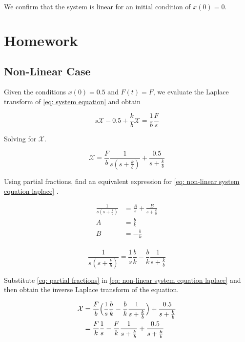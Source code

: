 We confirm that the system is linear for an initial 
condition of $x(0)=0$.

\section{Homework}

\subsection{Non-Linear Case}

Given the conditions $x(0) = 0.5$ and $F(t) = F$, we 
evaluate the Laplace transform of \ref{eq: system equation} 
and obtain

\begin{equation}
  s \mathcal{X} - 0.5 + \frac{k}{b} \mathcal{X} = 
\frac{1}{b} \frac{F}{s}
\end{equation}

Solving for $\mathcal{X}$.

\begin{equation}
 \mathcal{X} = \frac{F}{b}
\frac{1}{s(s+\frac{k}{b})} + \frac{0.5}{s+\frac{k}{b}} 
\label{eq: non-linear system equation laplace}
\end{equation}

Using partial fractions, find an equivalent expression for 
\ref{eq: non-linear system equation laplace} .

\begin{equation*}
 \begin{split}
  \frac{1}{s(s+\frac{k}{b})}  & = \frac{A}{s} + 
\frac{B}{s+\frac{k}{b}}\\
A & = \frac{b}{k}\\
B &= -\frac{b}{k}\\
 \end{split}
\end{equation*}

\begin{equation}
 \frac{1}{s(s+\frac{k}{b})}   = \frac{1}{s} \frac{b}{k} - 
\frac{b}{k}
\frac{1}{s+\frac{k}{b}}
\label{eq: partial fractions}
\end{equation}

Substitute \ref{eq: partial fractions} in \ref{eq: 
non-linear system equation laplace} and then obtain the 
inverse Laplace transform of the equation.

\begin{equation*}
 \begin{split}
   \mathcal{X} & = \frac{F}{b}
\Bigl ( \frac{1}{s} \frac{b}{k} - 
\frac{b}{k}
\frac{1}{s+\frac{k}{b}} \Bigr) + \frac{0.5}{s+\frac{k}{b}} 
\\
& = \frac{F}{k} \frac{1}{s}  - 
\frac{F}{k}
\frac{1}{s+\frac{k}{b}} + \frac{0.5}{s+\frac{k}{b}} 
\\
 \end{split}
\end{equation*}

